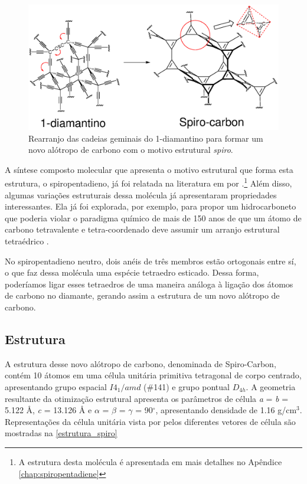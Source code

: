 	\begin{figure}[ht]
		\centering
		\includegraphics[width=1\linewidth]{capitulos/fig/results1/estrutura_1diamantino-spiro.eps}
		\caption{Rearranjo das cadeias geminais do 1-diamantino para formar um novo alótropo de carbono com o motivo estrutural \textit{spiro}.}
		\label{soliton}
	\end{figure}

	A síntese composto molecular que apresenta o motivo estrutural que forma esta estrutura, o spiropentadieno, já foi relatada na literatura em \citeyear{billups1991spiropentadiene} por \citeauthor{billups1991spiropentadiene}.\footnote{A estrutura desta molécula é apresentada em mais detalhes no Apêndice \autoref{chap:spiropentadiene}} Além disso, algumas variações estruturais dessa molécula já apresentaram propriedades interessantes. Ela já foi explorada, por exemplo, para propor um hidrocarboneto que poderia violar o paradigma químico de mais de 150 anos de que um átomo de carbono tetravalente e tetra-coordenado deve assumir um arranjo estrutural tetraédrico \cite{esteves2005neutral}. 
	
	No spiropentadieno neutro, dois anéis de três membros estão ortogonais entre sí, o que faz dessa molécula uma espécie tetraedro esticado. Dessa forma, poderíamos ligar esses tetraedros de uma maneira análoga à ligação dos átomos de carbono no diamante, gerando assim a estrutura de um novo alótropo de carbono.

	\subsection{Estrutura}

	A estrutura desse novo alótropo de carbono, denominada de Spiro-Carbon, contém 10 átomos em uma célula unitária primitiva tetragonal de corpo centrado, apresentando grupo espacial $I4_1/amd$ (\#141) e grupo pontual $D_{4h}$. A geometria resultante da otimização estrutural apresenta os parâmetros de célula \textit{a} = \textit{b} = 5.122 \AA{}, \textit{c} = 13.126 \AA{} e $\alpha$ = $\beta$ = $\gamma$ = 90$^\circ$, apresentando densidade de 1.16 g/cm$^3$. Representações da célula unitária vista por pelos diferentes vetores de célula são mostradas na \autoref{estrutura_spiro}
	
